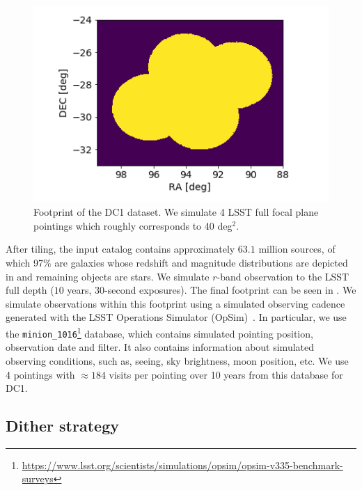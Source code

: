 \documentclass[\docopts]{\docclass}
\begin{document}
\begin{figure}
\centering
\includegraphics[width=0.9\columnwidth]{footprint.png}
\caption{Footprint of the DC1 dataset. We simulate 4 LSST full focal plane pointings which roughly corresponds to 40 deg$^{2}$.}
\label{fig:footprint}
\end{figure}

After tiling, the input catalog contains approximately $63.1$ million sources, of which 97\% are galaxies whose redshift and magnitude distributions are depicted in  and remaining objects are stars. We simulate $r$-band observation to the LSST full depth ($10$ years, 30-second exposures). The final footprint can be seen in . We simulate observations within this footprint using a simulated observing cadence generated with the LSST Operations Simulator (OpSim)~\citep{2014SPIE.9150E..15D}. In particular, we use the \texttt{minion\_1016}\footnote{\url{https://www.lsst.org/scientists/simulations/opsim/opsim-v335-benchmark-surveys}} database, which contains simulated pointing position, observation date and filter. It also contains information about simulated observing conditions, such as, seeing, sky brightness, moon position, etc. We use 4 pointings with $\approx 184$ visits per pointing over 10 years from this database for DC1.

\subsection{Dither strategy}
\label{sec:dithering}
\end{document}
